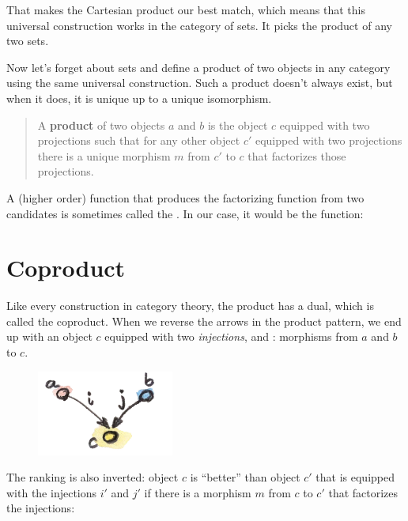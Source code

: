 That makes the Cartesian product  our best match, which
means that this universal construction works in the category of sets. It
picks the product of any two sets.

Now let's forget about sets and define a product of two objects in any
category using the same universal construction. Such a product doesn't
always exist, but when it does, it is unique up to a unique isomorphism.

\begin{quote}
  A \textbf{product} of two objects $a$ and $b$ is the object
  $c$ equipped with two projections such that for any other object
  $c'$ equipped with two projections there is a unique morphism
  $m$ from $c'$ to $c$ that factorizes those projections.
\end{quote}

\noindent
A (higher order) function that produces the factorizing function
 from two candidates is sometimes called the
. In our case, it would be the function:


\section{Coproduct}

Like every construction in category theory, the product has a dual,
which is called the coproduct. When we reverse the arrows in the product
pattern, we end up with an object $c$ equipped with two
\emph{injections},  and : morphisms from $a$
and $b$ to $c$.


\begin{figure}[H]
  \centering
  \includegraphics[width=0.4\textwidth]{images/coproductpattern.jpg}
\end{figure}

\noindent
The ranking is also inverted: object $c$ is ``better'' than object
$c'$ that is equipped with the injections $i'$ and $j'$
if there is a morphism $m$ from $c$ to $c'$ that
factorizes the injections:

